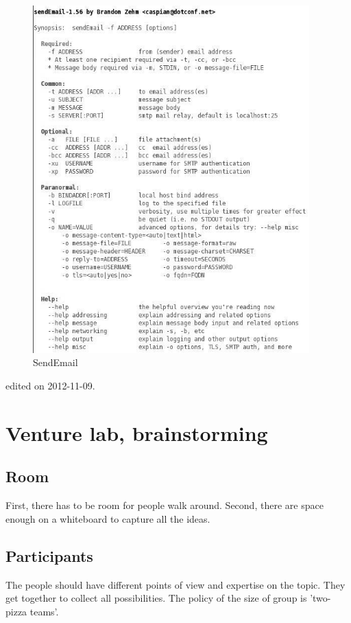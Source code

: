\begin{figure}[htbp]
\centering
\includegraphics[width=0.95\textwidth]{./Chapters/pictures/sendEmail.jpg}
\caption{SendEmail}
\label{fig:send:mail:command}
\end{figure}
\hfill {\tiny  edited on 2012-11-09.}

\section{Venture lab, brainstorming}
\subsection{Room}
First, there has to be room for people walk around.
Second, there are space enough on a whiteboard to capture all the ideas.
\subsection{Participants}
The people should have different points of view and expertise on the topic.
They get together to collect all possibilities.
The policy of the size of group is 'two-pizza teams'.
